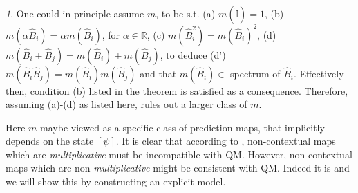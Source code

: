 \documentclass[british,aps,prl,superscriptaddress,nofootinbib,times,reprint]{revtex4-1}
\theoremstyle{plain}
\theoremstyle{definition}
\theoremstyle{remark}
\theoremstyle{remark}
\theoremstyle{remark}
\newtheorem{thmrem}{\protect\remarkname}[thm]
\theoremstyle{plain}
\theoremstyle{plain}
\theoremstyle{plain}
\theoremstyle{definition}
\theoremstyle{definition}
\providecommand{\remarkname}{Remark}
\begin{document}
\begin{thmrem} One could in principle assume $m$, to
be s.t. (a) $m(\hat{\mathbb{I}})=1$, (b)
$m(\alpha\hat{B}_{i})=\alpha m(\hat{B}_{i})$, for
$\alpha\in\mathbb{R}$, (c)
$m(\hat{B}_{i}^{2})=m(\hat{B}_{i})^{2}$, (d)
$m(\hat{B}_{i}+\hat{B}_{j})=m(\hat{B}_{i})+m(\hat{B}_{j})$,
to deduce (d')
$m(\hat{B}_{i}\hat{B}_{j})=m(\hat{B}_{i})m(\hat{B}_{j})$
and that $m(\hat{B}_{i})\in$ spectrum of
$\hat{B}_{i}$. Effectively then, condition (b)
listed in the theorem is satisfied as a
consequence.  Therefore, assuming (a)-(d) as
listed here, rules out a larger class of $m$.
\cite{KochenSpecker} 
\end{thmrem} 
Here $m$ maybe viewed as a specific
class of prediction maps, that implicitly depends
on the state $[\psi]$. It is clear that according to
, non-contextual maps which are
\emph{multiplicative} must be incompatible with
QM. However, non-contextual maps which are
non-\emph{multiplicative} might be consistent with
QM. Indeed it is and we will show this by constructing an
explicit model.
\end{document}
